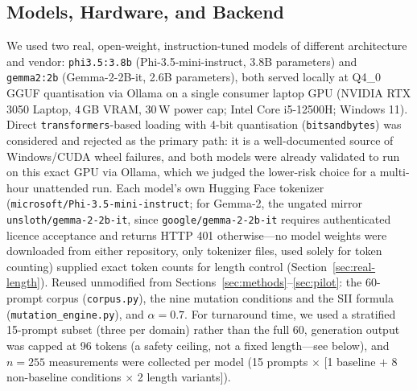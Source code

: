 \documentclass[conference]{IEEEtran}
\begin{document}
\subsection{Models, Hardware, and Backend}
\label{sec:real-setup}
We used two real, open-weight, instruction-tuned models of different
architecture and vendor: \texttt{phi3.5:3.8b} (Phi-3.5-mini-instruct,
3.8B parameters) and \texttt{gemma2:2b} (Gemma-2-2B-it, 2.6B
parameters), both served locally at Q4\_0 GGUF quantisation via
Ollama on a single consumer laptop GPU (NVIDIA RTX 3050 Laptop, 4\,GB
VRAM, 30\,W power cap; Intel Core i5-12500H; Windows 11). Direct
\texttt{transformers}-based loading with 4-bit quantisation
(\texttt{bitsandbytes}) was considered and rejected as the primary
path: it is a well-documented source of Windows/CUDA wheel failures,
and both models were already validated to run on this exact GPU via
Ollama, which we judged the lower-risk choice for a multi-hour
unattended run. Each model's own Hugging Face tokenizer
(\texttt{microsoft/Phi-3.5-mini-instruct}; for Gemma-2, the ungated
mirror \texttt{unsloth/gemma-2-2b-it}, since \texttt{google/gemma-2-2b-it}
requires authenticated licence acceptance and returns HTTP 401
otherwise---no model weights were downloaded from either repository,
only tokenizer files, used solely for token counting) supplied exact
token counts for length control (Section~\ref{sec:real-length}).
Reused unmodified from Sections~\ref{sec:methods}--\ref{sec:pilot}:
the 60-prompt corpus (\texttt{corpus.py}), the nine mutation
conditions and the SII formula (\texttt{mutation\_engine.py}), and
$\alpha=0.7$. For turnaround time, we used a stratified 15-prompt
subset (three per domain) rather than the full 60, generation output
was capped at 96 tokens (a safety ceiling, not a fixed length---see
below), and $n=255$ measurements were collected per model (15 prompts
$\times$ [1 baseline $+$ 8 non-baseline conditions $\times$ 2 length
variants]).
\end{document}
